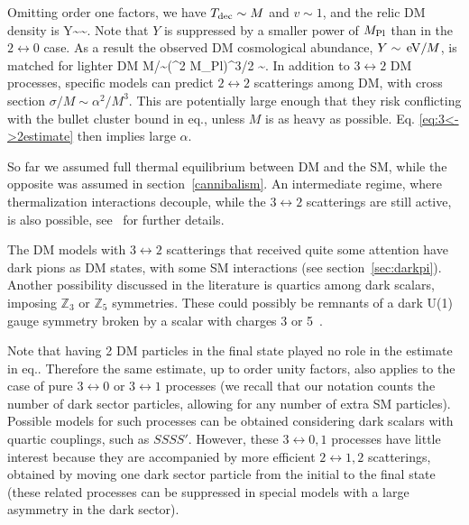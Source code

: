 Omitting order one factors, we have $T_{\rm dec}\sim M$ and $v\sim 1$, and the relic DM density
is 
\beq
Y\sim {}\sim {}.
\eeq
Note that $Y$ is 
suppressed by a smaller power of $M_{\rm Pl}$ than in the $2\leftrightarrow0$ case.
As a result the observed DM cosmological abundance, $Y \sim \,{\rm eV}/M$,
is matched for  lighter DM
\beq \label{eq:3<->2estimate}
M/\alpha \sim (\eV^2 M_{\rm Pl})^{3/2}  \sim \GeV.\eeq
In addition to $3\leftrightarrow2$ DM processes, specific models
can predict $2\leftrightarrow2$  scatterings among DM, with cross section
$\sigma/M \sim \alpha^2/M^3$. This are potentially large enough that they risk conflicting with the bullet cluster bound in eq.,
unless $M$ is as heavy as possible. Eq. \eqref{eq:3<->2estimate} then implies large $\alpha$.



 \smallskip
 
So far  we assumed full thermal equilibrium between DM and the SM, 
while the opposite was assumed in section~\ref{cannibalism}.
An intermediate regime, where thermalization interactions decouple, while the
$3\leftrightarrow 2$ scatterings are still active, is also possible, see~\cite{MeVDM} for further details.

\smallskip

The DM models with $3\leftrightarrow2$ scatterings that received quite some attention 
have dark pions as DM states, with some SM interactions (see section~\ref{sec:darkpi}). Another possibility discussed in the literature is 
quartics among dark scalars, imposing $\mathbb{Z}_3$ or $\mathbb{Z}_5$
symmetries. These could possibly be remnants of a dark U(1) gauge symmetry broken by a scalar with charges 3 or 5~\cite{MeVDM}.

\smallskip

Note that having 2 DM particles in the final state played no role in the estimate in eq..
Therefore the same estimate, up to order unity factors, also applies to the case of pure $3 \leftrightarrow0$ or $3 \leftrightarrow1$ processes
(we recall that our notation counts the number of dark sector particles, allowing for any number of extra SM particles).
Possible models for such processes can be obtained considering dark scalars with quartic couplings, such as $SSSS'$.
However, these $3 \leftrightarrow 0,1$ processes have little interest because they are accompanied by 
more efficient  $2 \leftrightarrow 1,2$ scatterings,
obtained by moving one dark sector particle from the initial to the final state
(these related processes can be suppressed in special models with a large asymmetry in the dark sector).


